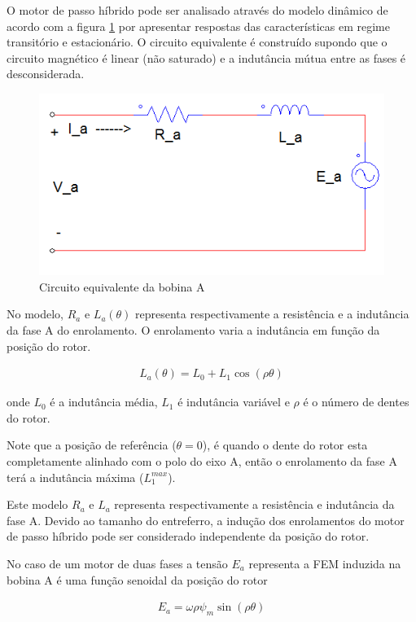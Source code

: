 
O motor de passo híbrido pode ser analisado através do modelo dinâmico de acordo com a figura \ref{fig:fig1} por apresentar respostas das características em regime transitório e estacionário. O circuito equivalente é construído supondo que o circuito magnético é linear (não saturado) e a indutância mútua entre as fases é desconsiderada.

\begin{figure}[H]
	\centering
	\includegraphics[scale=.42]{Images/graficofasea.PNG}
	\caption{ Circuito equivalente da bobina A}
	\label{fig:fig1}
\end{figure}

No modelo, $R_a$ e $L_a(\theta)$ representa respectivamente a resistência e a indutância da fase A do enrolamento. O enrolamento varia a indutância em função da posição do rotor.

\begin{eqnarray}
	\label{eq:eq1a}
	L_a(\theta) = L_0 + L_1\cos(\rho \theta)
\end{eqnarray}

onde $L_0$ é a indutância média, $L_1$ é indutância variável  e $\rho$ é o número de dentes do rotor.

Note que a posição de referência ($\theta = 0$), é quando o dente do rotor esta completamente alinhado com o polo do eixo A, então o enrolamento da fase A terá a indutância máxima ($L_1^{max}$).

Este modelo $R_a$ e $L_a$ representa respectivamente a resistência e indutância da fase A. Devido ao tamanho do entreferro, a indução dos enrolamentos do motor de passo híbrido pode ser considerado independente da posição do rotor. 

No caso de um motor de duas fases a tensão $E_a$ representa a FEM induzida na bobina A é uma função senoidal da posição do rotor

\begin{eqnarray}
	\label{eq:eq2a}
	E_a = \omega \rho \psi_m \sin(\rho \theta)
\end{eqnarray}

